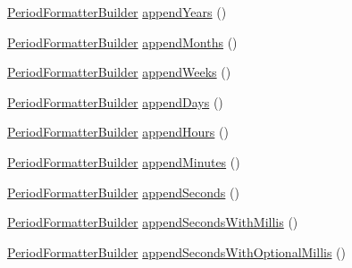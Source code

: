 \begin{DoxyCompactItemize}
\item 
\hyperlink{classorg_1_1joda_1_1time_1_1format_1_1_period_formatter_builder}{Period\-Formatter\-Builder} \hyperlink{classorg_1_1joda_1_1time_1_1format_1_1_period_formatter_builder_a467b0bb6eebb620938365d197458f1c5}{append\-Years} ()
\item 
\hyperlink{classorg_1_1joda_1_1time_1_1format_1_1_period_formatter_builder}{Period\-Formatter\-Builder} \hyperlink{classorg_1_1joda_1_1time_1_1format_1_1_period_formatter_builder_a10d45df75c1efda493d558f75d8327e0}{append\-Months} ()
\item 
\hyperlink{classorg_1_1joda_1_1time_1_1format_1_1_period_formatter_builder}{Period\-Formatter\-Builder} \hyperlink{classorg_1_1joda_1_1time_1_1format_1_1_period_formatter_builder_adebd03af0a08bad1d8f57dbdbf9708f6}{append\-Weeks} ()
\item 
\hyperlink{classorg_1_1joda_1_1time_1_1format_1_1_period_formatter_builder}{Period\-Formatter\-Builder} \hyperlink{classorg_1_1joda_1_1time_1_1format_1_1_period_formatter_builder_adc3469d0dd94278706a5bd1fcb7e1ed7}{append\-Days} ()
\item 
\hyperlink{classorg_1_1joda_1_1time_1_1format_1_1_period_formatter_builder}{Period\-Formatter\-Builder} \hyperlink{classorg_1_1joda_1_1time_1_1format_1_1_period_formatter_builder_a975ffc227986f87657549b7fdd6031a5}{append\-Hours} ()
\item 
\hyperlink{classorg_1_1joda_1_1time_1_1format_1_1_period_formatter_builder}{Period\-Formatter\-Builder} \hyperlink{classorg_1_1joda_1_1time_1_1format_1_1_period_formatter_builder_ac78c829fe025e984cee4f85672098205}{append\-Minutes} ()
\item 
\hyperlink{classorg_1_1joda_1_1time_1_1format_1_1_period_formatter_builder}{Period\-Formatter\-Builder} \hyperlink{classorg_1_1joda_1_1time_1_1format_1_1_period_formatter_builder_a562b71b88aedc3a7f51d87c48ea2fd2b}{append\-Seconds} ()
\item 
\hyperlink{classorg_1_1joda_1_1time_1_1format_1_1_period_formatter_builder}{Period\-Formatter\-Builder} \hyperlink{classorg_1_1joda_1_1time_1_1format_1_1_period_formatter_builder_acc633991cbb6e638f7fe7edbea84f787}{append\-Seconds\-With\-Millis} ()
\item 
\hyperlink{classorg_1_1joda_1_1time_1_1format_1_1_period_formatter_builder}{Period\-Formatter\-Builder} \hyperlink{classorg_1_1joda_1_1time_1_1format_1_1_period_formatter_builder_a753487ced1346133015898333750b7b1}{append\-Seconds\-With\-Optional\-Millis} ()
\item 

\end{DoxyCompactItemize}
